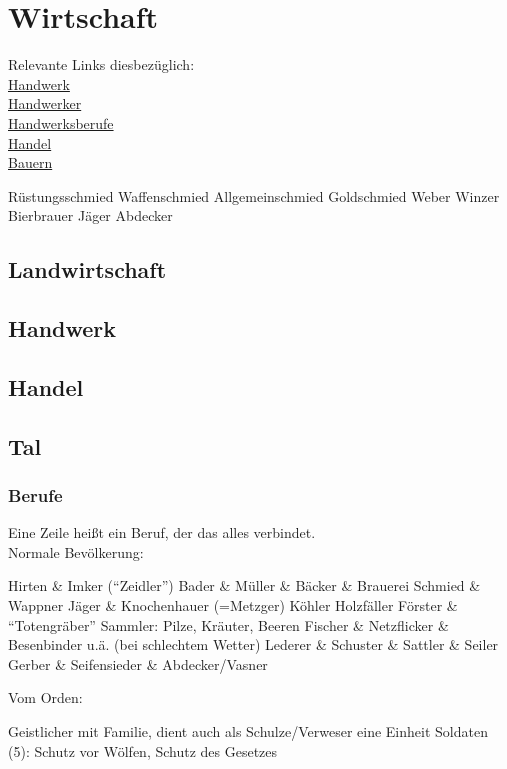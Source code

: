 \chapter{Wirtschaft}
Relevante Links diesbezüglich: \\
\href{https://www.leben-im-mittelalter.net/kultur-im-mittelalter/wirtschaft/handwerk.html}{Handwerk} \\
\href{https://www.leben-im-mittelalter.net/alltag-im-mittelalter/arbeit-und-berufe/handwerker.html}{Handwerker} \\
\href{https://www.leben-im-mittelalter.net/alltag-im-mittelalter/arbeit-und-berufe/handwerker/handwerksberufe.html}{Handwerksberufe} \\
\href{https://www.leben-im-mittelalter.net/kultur-im-mittelalter/wirtschaft/handel.html}{Handel}\\
\href{https://www.leben-im-mittelalter.net/alltag-im-mittelalter/arbeit-und-berufe/bauern.html}{Bauern}\\


\begin{outline}
	\1 Rüstungsschmied
	\1 Waffenschmied
	\1 Allgemeinschmied
	\1 Goldschmied
	\1 Weber
	\1 Winzer
	\1 Bierbrauer
	\1 Jäger
	\1 Abdecker
\end{outline}

\section{Landwirtschaft}


\section{Handwerk}

\section{Handel}

\section{Tal}
\subsection{Berufe}
Eine Zeile heißt ein Beruf, der das alles verbindet. \\
Normale Bevölkerung:
\begin{outline}
	 Hirten \& Imker ("`Zeidler"') 
	 Bader \& Müller \& Bäcker \& Brauerei
	 Schmied \& Wappner
	 Jäger \& Knochenhauer (=Metzger)
	 Köhler
	 Holzfäller
	 Förster \& "`Totengräber"'
	 Sammler: Pilze, Kräuter, Beeren
	 Fischer \& Netzflicker \& Besenbinder u.ä. (bei schlechtem Wetter)
	 Lederer \& Schuster \& Sattler \& Seiler
	 Gerber \& Seifensieder \& Abdecker/Vasner
\end{outline}

Vom Orden:
\begin{outline}
	 Geistlicher mit Familie, dient auch als Schulze/Verweser
	\1 eine Einheit Soldaten (5): Schutz vor Wölfen, Schutz des Gesetzes
\end{outline}
